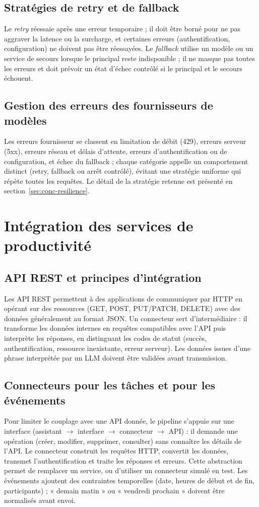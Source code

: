 \documentclass[11pt,a4paper,openany,oneside]{report}
\begin{document}
\subsection{Stratégies de retry et de fallback}
Le \emph{retry} réessaie après une erreur temporaire ; il doit être borné pour ne pas aggraver la latence ou la surcharge, et certaines erreurs (authentification, configuration) ne doivent pas être réessayées. Le \emph{fallback} utilise un modèle ou un service de secours lorsque le principal reste indisponible ; il ne masque pas toutes les erreurs et doit prévoir un état d'échec contrôlé si le principal et le secours échouent.

\subsection{Gestion des erreurs des fournisseurs de modèles}
Les erreurs fournisseur se classent en limitation de débit (429), erreurs serveur (5xx), erreurs réseau et délais d'attente, erreurs d'authentification ou de configuration, et échec du fallback ; chaque catégorie appelle un comportement distinct (retry, fallback ou arrêt contrôlé), évitant une stratégie uniforme qui répète toutes les requêtes. Le détail de la stratégie retenue est présenté en section~\ref{sec:conc-resilience}.

\section{Intégration des services de productivité}
\subsection{API REST et principes d'intégration}
Les API REST permettent à des applications de communiquer par HTTP en opérant sur des ressources (GET, POST, PUT/PATCH, DELETE) avec des données généralement au format JSON. Un connecteur sert d'intermédiaire : il transforme les données internes en requêtes compatibles avec l'API puis interprète les réponses, en distinguant les codes de statut (succès, authentification, ressource inexistante, erreur serveur). Les données issues d'une phrase interprétée par un LLM doivent être validées avant transmission.

\subsection{Connecteurs pour les tâches et pour les événements}
Pour limiter le couplage avec une API donnée, le pipeline s'appuie sur une interface (assistant $\rightarrow$ interface $\rightarrow$ connecteur $\rightarrow$ API) : il demande une opération (créer, modifier, supprimer, consulter) sans connaître les détails de l'API. Le connecteur construit les requêtes HTTP, convertit les données, transmet l'authentification et traite les réponses et erreurs. Cette abstraction permet de remplacer un service, ou d'utiliser un connecteur simulé en test. Les événements ajoutent des contraintes temporelles (date, heures de début et de fin, participants) ; « demain matin » ou « vendredi prochain » doivent être normalisés avant envoi.
\end{document}
